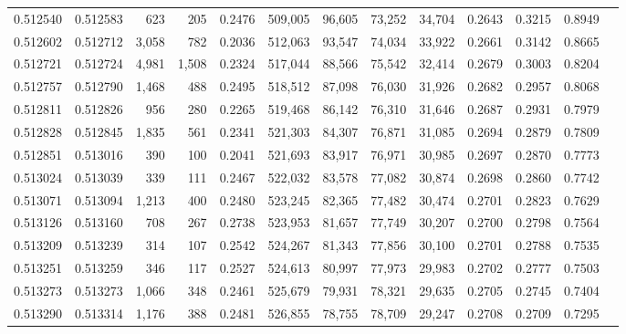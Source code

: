\begin{tabular}{rrrrrrrrrrrrr}
0.512540 & 0.512583 &   623 &   205 &                                     0.2476 & 509,005 &  96,605 &  73,252 &  34,704 & 0.2643 & 0.3215 & 0.8949 \\
0.512602 & 0.512712 & 3,058 &   782 &                                     0.2036 & 512,063 &  93,547 &  74,034 &  33,922 & 0.2661 & 0.3142 & 0.8665 \\
0.512721 & 0.512724 & 4,981 & 1,508 &                                     0.2324 & 517,044 &  88,566 &  75,542 &  32,414 & 0.2679 & 0.3003 & 0.8204 \\
0.512757 & 0.512790 & 1,468 &   488 &                                     0.2495 & 518,512 &  87,098 &  76,030 &  31,926 & 0.2682 & 0.2957 & 0.8068 \\
0.512811 & 0.512826 &   956 &   280 &                                     0.2265 & 519,468 &  86,142 &  76,310 &  31,646 & 0.2687 & 0.2931 & 0.7979 \\
0.512828 & 0.512845 & 1,835 &   561 &                                     0.2341 & 521,303 &  84,307 &  76,871 &  31,085 & 0.2694 & 0.2879 & 0.7809 \\
0.512851 & 0.513016 &   390 &   100 &                                     0.2041 & 521,693 &  83,917 &  76,971 &  30,985 & 0.2697 & 0.2870 & 0.7773 \\
0.513024 & 0.513039 &   339 &   111 &                                     0.2467 & 522,032 &  83,578 &  77,082 &  30,874 & 0.2698 & 0.2860 & 0.7742 \\
0.513071 & 0.513094 & 1,213 &   400 &                                     0.2480 & 523,245 &  82,365 &  77,482 &  30,474 & 0.2701 & 0.2823 & 0.7629 \\
0.513126 & 0.513160 &   708 &   267 &                                     0.2738 & 523,953 &  81,657 &  77,749 &  30,207 & 0.2700 & 0.2798 & 0.7564 \\
0.513209 & 0.513239 &   314 &   107 &                                     0.2542 & 524,267 &  81,343 &  77,856 &  30,100 & 0.2701 & 0.2788 & 0.7535 \\
0.513251 & 0.513259 &   346 &   117 &                                     0.2527 & 524,613 &  80,997 &  77,973 &  29,983 & 0.2702 & 0.2777 & 0.7503 \\
0.513273 & 0.513273 & 1,066 &   348 &                                     0.2461 & 525,679 &  79,931 &  78,321 &  29,635 & 0.2705 & 0.2745 & 0.7404 \\
0.513290 & 0.513314 & 1,176 &   388 &                                     0.2481 & 526,855 &  78,755 &  78,709 &  29,247 & 0.2708 & 0.2709 & 0.7295 \\

\end{tabular}
